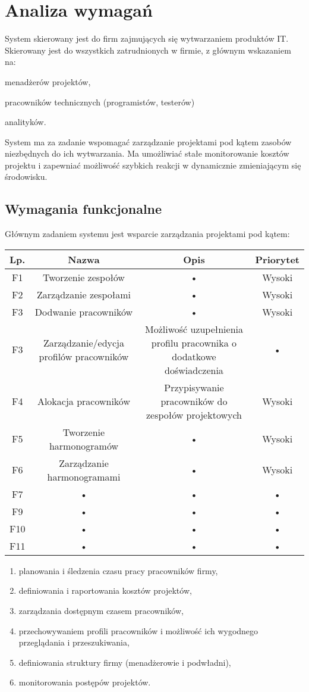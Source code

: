 \section{Analiza wymagań}
System skierowany jest do firm zajmujących się wytwarzaniem produktów IT. Skierowany jest do wszystkich zatrudnionych w firmie, z głównym wskazaniem na:
\begin{itemize*}
\item menadżerów projektów,
\item pracowników technicznych (programistów, testerów)
\item analityków.
\end{itemize*}

System ma za zadanie wspomagać zarządzanie projektami pod kątem zasobów niezbędnych do ich wytwarzania. Ma umożliwiać stałe monitorowanie kosztów projektu i zapewniać możliwość szybkich reakcji w dynamicznie zmieniającym się środowisku.
\subsection{Wymagania funkcjonalne}
Głównym zadaniem systemu jest wsparcie zarządzania projektami pod kątem:

\begin{tabular}{|c|c|c|c|}
\hline 
Lp. & Nazwa & Opis & Priorytet \\ 
\hline 
F1 & Tworzenie zespołów & • & Wysoki \\ 
\hline 
F2 & Zarządzanie zespołami & • & Wysoki \\ 
\hline 
F3 & Dodwanie pracowników & • & Wysoki \\ 
\hline 
F3 & Zarządzanie/edycja profilów pracowników & Możliwość uzupełnienia profilu pracownika o dodatkowe doświadczenia & • \\ 
\hline 
F4 & Alokacja pracowników & Przypisywanie pracowników do zespołów projektowych & Wysoki \\ 
\hline 
F5 & Tworzenie harmonogramów & • & Wysoki \\ 
\hline 
F6 & Zarządzanie harmonogramami & • & Wysoki \\ 
\hline 
F7 & • & • & • \\ 
\hline 
F9 & • & • & • \\ 
\hline 
F10 & • & • & • \\ 
\hline 
F11 & • & • & • \\ 
\hline 
\end{tabular} 
\begin{enumerate}
\item planowania i śledzenia czasu pracy pracowników firmy,
\item definiowania i raportowania kosztów projektów,
\item zarządzania dostępnym czasem pracowników,
\item przechowywaniem profili pracowników i możliwość ich wygodnego przeglądania i przeszukiwania,
\item definiowania struktury firmy (menadżerowie i podwładni),
\item monitorowania postępów projektów.
\end{enumerate}

